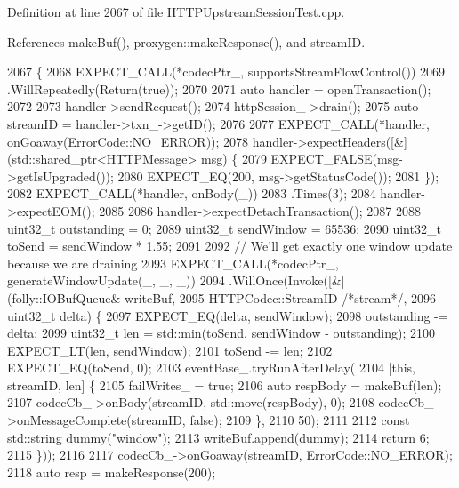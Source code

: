 Definition at line 2067 of file H\+T\+T\+P\+Upstream\+Session\+Test.\+cpp.



References make\+Buf(), proxygen\+::make\+Response(), and stream\+ID.


\begin{DoxyCode}
2067                                                     \{
2068   EXPECT\_CALL(*codecPtr\_, supportsStreamFlowControl())
2069     .WillRepeatedly(Return(\textcolor{keyword}{true}));
2070 
2071   \textcolor{keyword}{auto} handler = openTransaction();
2072 
2073   handler->sendRequest();
2074   httpSession\_->drain();
2075   \textcolor{keyword}{auto} streamID = handler->txn\_->getID();
2076 
2077   EXPECT\_CALL(*handler, onGoaway(ErrorCode::NO\_ERROR));
2078   handler->expectHeaders([&] (std::shared\_ptr<HTTPMessage> msg) \{
2079       EXPECT\_FALSE(msg->getIsUpgraded());
2080       EXPECT\_EQ(200, msg->getStatusCode());
2081     \});
2082   EXPECT\_CALL(*handler, onBody(\_))
2083     .Times(3);
2084   handler->expectEOM();
2085 
2086   handler->expectDetachTransaction();
2087 
2088   uint32\_t outstanding = 0;
2089   uint32\_t sendWindow = 65536;
2090   uint32\_t toSend = sendWindow * 1.55;
2091 
2092   \textcolor{comment}{// We'll get exactly one window update because we are draining}
2093   EXPECT\_CALL(*codecPtr\_, generateWindowUpdate(\_, \_, \_))
2094       .WillOnce(Invoke([&](folly::IOBufQueue& writeBuf,
2095                            HTTPCodec::StreamID \textcolor{comment}{/*stream*/},
2096                            uint32\_t delta) \{
2097         EXPECT\_EQ(delta, sendWindow);
2098         outstanding -= delta;
2099         uint32\_t len = std::min(toSend, sendWindow - outstanding);
2100         EXPECT\_LT(len, sendWindow);
2101         toSend -= len;
2102         EXPECT\_EQ(toSend, 0);
2103         eventBase\_.tryRunAfterDelay(
2104             [\textcolor{keyword}{this}, streamID, len] \{
2105               failWrites\_ = \textcolor{keyword}{true};
2106               \textcolor{keyword}{auto} respBody = makeBuf(len);
2107               codecCb\_->onBody(streamID, std::move(respBody), 0);
2108               codecCb\_->onMessageComplete(streamID, \textcolor{keyword}{false});
2109             \},
2110             50);
2111 
2112         \textcolor{keyword}{const} std::string dummy(\textcolor{stringliteral}{"window"});
2113         writeBuf.append(dummy);
2114         \textcolor{keywordflow}{return} 6;
2115       \}));
2116 
2117   codecCb\_->onGoaway(streamID, ErrorCode::NO\_ERROR);
2118   \textcolor{keyword}{auto} resp = makeResponse(200);

\end{DoxyCode}
